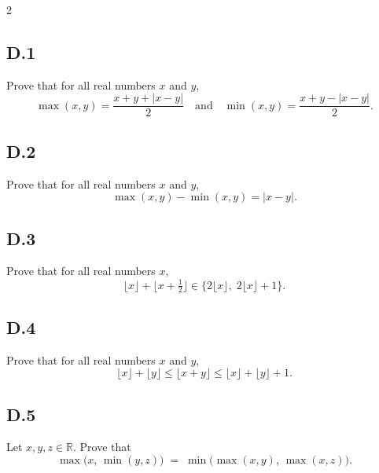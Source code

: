 \documentclass[9pt]{article}
\begin{document}
\begin{multicols}{2}
\subsection*{D.1}
Prove that for all real numbers \( x \) and \( y \),
\[
\max(x,y) = \frac{x+y+|x-y|}{2}
\quad\text{and}\quad
\min(x,y) = \frac{x+y-|x-y|}{2}.
\]

\subsection*{D.2}
Prove that for all real numbers \( x \) and \( y \),
\[
\max(x,y) - \min(x,y) = |x-y|.
\]

\subsection*{D.3}
Prove that for all real numbers \( x \),
\[
\lfloor x \rfloor + \lfloor x + \tfrac12 \rfloor
\in \{2\lfloor x \rfloor,\; 2\lfloor x \rfloor + 1\}.
\]

\subsection*{D.4}
Prove that for all real numbers \( x \) and \( y \),
\[
\lfloor x \rfloor + \lfloor y \rfloor
\le \lfloor x + y \rfloor
\le \lfloor x \rfloor + \lfloor y \rfloor + 1.
\]

\subsection*{D.5}
Let \( x,y,z \in \mathbb{R} \). Prove that
\[
\max\!\bigl(x,\, \min(y,z)\bigr)
\;=\;
\min\!\bigl(\max(x,y),\, \max(x,z)\bigr).
\]



\end{multicols}
\end{document}
